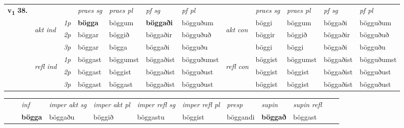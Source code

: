\begin{tabular}{llllllllllll} \toprule
\multirow{4}{*}{{{\textbf{v{\textsubscript{1}}} \Large{\textbf{38.}}}}}  & &   &  \textit{praes sg}  & \textit{praes pl}  &\textit{ pf sg} & \textit{pf pl} &  &  \textit{praes sg}  & \textit{praes pl}  & \textit{pf sg} & \textit{pf pl } \\*
	\cmidrule{4-7} \cmidrule{9-12}
 & \multirow{3}{*}{\begin{turn}{90}\textit{akt ind}\end{turn}} & {\textit{1p}} & \textbf{bögga} & böggum    & \textbf{böggaði} & bögguðum & \multirow{3}{*}{\begin{turn}{90}\textit{akt con}\end{turn}} &böggi & böggum & böggaði & bögguðum\\*
& &  {\textit{2p}} &  böggar  & böggið   & böggaðir & bögguðuð & & böggir & böggið & böggaðir & bögguðuð \\*
& &  {\textit{3p}} & böggar & bögga   & böggaði & bögguðu & & böggi & böggi& böggaði & bögguðu  \\*
\cmidrule{4-7} \cmidrule{9-12}
 &\multirow{3}{*}{\begin{turn}{90}\textit{refl ind}\end{turn}} & {\textit{1p}} & böggast & böggumst    & böggaðist & bögguðumst & \multirow{3}{*}{\begin{turn}{90}\textit{refl con}\end{turn}}  &böggist & böggumst & böggaðist & bögguðumst\\*
 &&  {\textit{2p}} &  böggast  & böggist   & böggaðist & bögguðust & &böggist & böggist & böggaðist & bögguðust \\*
& &  {\textit{3p}} & böggast & böggast   & böggaðist & bögguðust & & böggist & böggist& böggaðist & bögguðust  \\*
\cmidrule{4-7} \cmidrule{9-12}
\end{tabular}


\begin{tabular}{llllllllllll}
 & & \textit{inf} & \textit{imper akt sg} & \textit{imper akt pl} & \textit{imper refl sg} & \textit{imper refl pl} & \textit{presp} & \textit{supin} & \textit{supin refl}      \\*
  & & \textbf{bögga} & böggaðu  & böggið & böggastu & böggist & böggandi &  \textbf{böggað} & böggast  \\*
\cmidrule{1-12}
\end{tabular}



